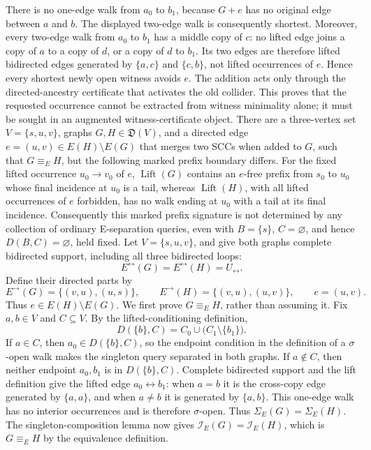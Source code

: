 There is no one-edge walk from \(a_0\) to \(b_1\), because \(G+e\) has no original edge between \(a\) and \(b\).  The displayed two-edge walk is consequently shortest.  Moreover, every two-edge walk from \(a_0\) to \(b_1\) has a middle copy of \(c\): no lifted edge joins a copy of \(a\) to a copy of \(d\), or a copy of \(d\) to \(b_1\).  Its two edges are therefore lifted bidirected edges generated by \(\{a,c\}\) and \(\{c,b\}\), not lifted occurrences of \(e\).  Hence every shortest newly open witness avoids \(e\).  The addition acts only through the directed-ancestry certificate that activates the old collider.  This proves that the requested occurrence cannot be extracted from witness minimality alone; it must be sought in an augmented witness-certificate object.
There are a three-vertex set \(V=\{s,u,v\}\), graphs \(G,H\in\mathfrak D(V)\), and a directed edge \(e=(u,v)\in E(H)\setminus E(G)\) that merges two SCCs when added to \(G\), such that \(G\equiv_E H\), but the following marked prefix boundary differs.  For the fixed lifted occurrence \(u_0\to v_0\) of \(e\), \(\operatorname{Lift}(G)\) contains an \(e\)-free prefix from \(s_0\) to \(u_0\) whose final incidence at \(u_0\) is a tail, whereas \(\operatorname{Lift}(H)\), with all lifted occurrences of \(e\) forbidden, has no walk ending at \(u_0\) with a tail at its final incidence.  Consequently this marked prefix signature is not determined by any collection of ordinary E-separation queries, even with \(B=\{s\}\), \(C=\varnothing\), and hence \(D(B,C)=\varnothing\), held fixed.
Let \(V=\{s,u,v\}\), and give both graphs complete bidirected support, including all three bidirected loops:
\[
 E^{\leftrightarrow}(G)=E^{\leftrightarrow}(H)=U_{\leftrightarrow}.
\]
Define their directed parts by
\[
 E^{\to}(G)=\{(v,u),(u,s)\},
 \qquad E^{\to}(H)=\{(v,u),(u,v)\},
 \qquad e=(u,v).
\]
Thus \(e\in E(H)\setminus E(G)\).  We first prove \(G\equiv_EH\), rather than assuming it.  Fix \(a,b\in V\) and \(C\subseteq V\).  By the lifted-conditioning definition,
\[
 D(\{b\},C)=C_0\cup\bigl(C_1\setminus\{b_1\}\bigr).
\]
If \(a\in C\), then \(a_0\in D(\{b\},C)\), so the endpoint condition in the definition of a \(\sigma\)-open walk makes the singleton query separated in both graphs.  If \(a\notin C\), then neither endpoint \(a_0,b_1\) is in \(D(\{b\},C)\).  Complete bidirected support and the lift definition give the lifted edge \(a_0\leftrightarrow b_1\): when \(a=b\) it is the cross-copy edge generated by \(\{a,a\}\), and when \(a\ne b\) it is generated by \(\{a,b\}\).  This one-edge walk has no interior occurrences and is therefore \(\sigma\)-open.  Thus \(\Sigma_E(G)=\Sigma_E(H)\).  The singleton-composition lemma now gives \(\mathcal I_E(G)=\mathcal I_E(H)\), which is \(G\equiv_EH\) by the equivalence definition.

